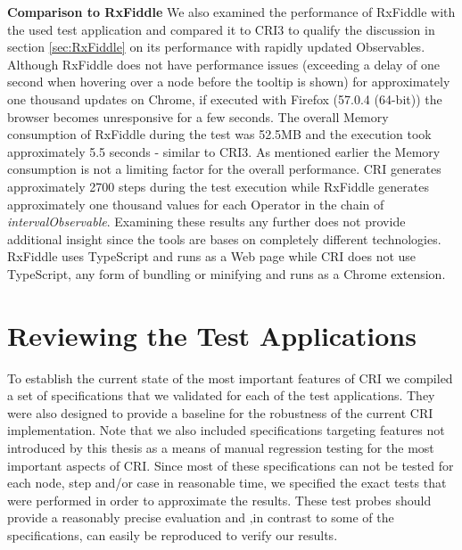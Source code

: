 	\textbf{Comparison to RxFiddle}
	We also examined the performance of RxFiddle with the used test application and compared it to CRI3 to qualify the discussion in section \ref{sec:RxFiddle} on its performance with rapidly updated Observables.
	Although RxFiddle does not have performance issues (exceeding a delay of one second when hovering over a node before the tooltip is shown) for approximately one thousand updates on Chrome, if executed with Firefox (57.0.4 (64-bit)) the browser becomes unresponsive for a few seconds. The overall Memory consumption of RxFiddle during the test was 52.5MB and the execution took approximately 5.5 seconds - similar to CRI3. As mentioned earlier the Memory consumption is not a limiting factor for the overall performance. CRI generates approximately 2700 steps during the test execution while RxFiddle generates approximately one thousand values for each Operator in the chain of \emph{intervalObservable}. Examining these results any further does not provide additional insight since the tools are bases on completely different technologies. RxFiddle uses TypeScript and runs as a Web page while CRI does not use TypeScript, any form of bundling or minifying and runs as a Chrome extension.
	
\section{Reviewing the Test Applications}
\label{sec:EvalTests}
To establish the current state of the most important features of CRI we compiled a set of specifications that we validated for each of the test applications. They were also designed to provide a baseline for the robustness of the current CRI implementation. Note that we also included specifications targeting features not introduced by this thesis as a means of manual regression testing for the most important aspects of CRI. Since most of these specifications can not be tested for each node, step and/or case in reasonable time, we specified the exact tests that were performed in order to approximate the results. These test probes should provide a reasonably precise evaluation and ,in contrast to some of the specifications, can easily be reproduced to verify our results.

